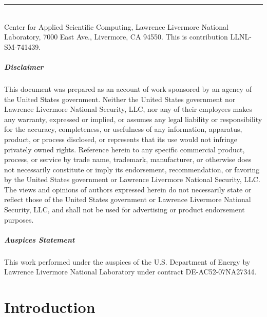 \documentclass[11pt]{report}
\begin{document}
{%

\null
\color{dark_grey} \hspace{-6mm}\rule{\textwidth}{2pt}\\
{\small
\fontfamily{\sfdefault}\selectfont Center for Applied Scientific
Computing, Lawrence Livermore National Laboratory, 7000 East Ave., Livermore, CA 94550. This is
contribution LLNL-SM-741439.
}
}



\pagebreak
{}
\paragraph {Disclaimer}
This document was prepared as an account of work sponsored by an agency of the United States
government. Neither the United States government nor Lawrence Livermore National Security, LLC, nor
any of their employees makes any warranty, expressed or implied, or assumes any legal liability or
responsibility for the accuracy, completeness, or usefulness of any information, apparatus, product,
or process disclosed, or represents that its use would not infringe privately owned
rights. Reference herein to any specific commercial product, process, or service by trade name,
trademark, manufacturer, or otherwise does not necessarily constitute or imply its endorsement,
recommendation, or favoring by the United States government or Lawrence Livermore National Security,
LLC. The views and opinions of authors expressed herein do not necessarily state or reflect those of
the United States government or Lawrence Livermore National Security, LLC, and shall not be used for
advertising or product endorsement purposes.

\paragraph{Auspices Statement}
This work performed under the auspices of the U.S. Department of Energy by Lawrence Livermore
National Laboratory under contract DE-AC52-07NA27344.
\tableofcontents


\chapter{Introduction}
\end{document}

